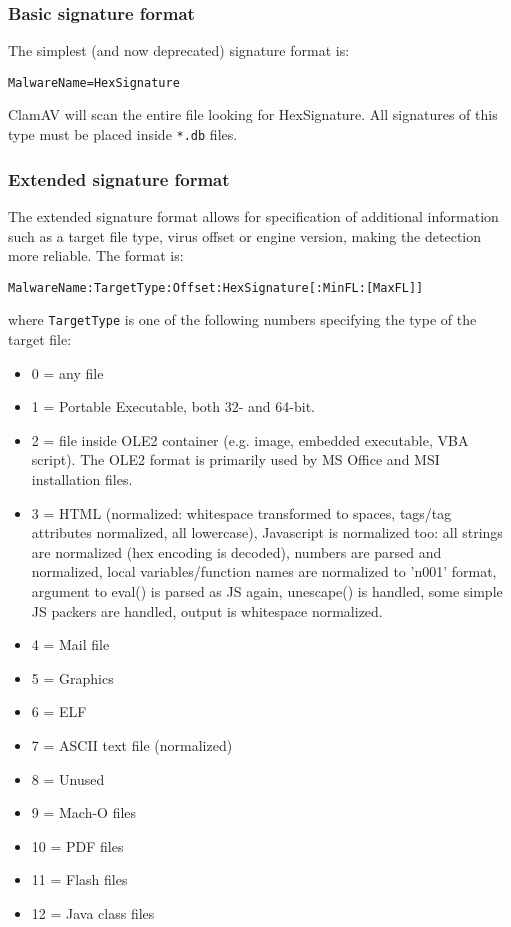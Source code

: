 \documentclass[a4paper,titlepage,12pt]{article}
\begin{document}
    \subsubsection{Basic signature format}
    The simplest (and now deprecated) signature format is:
    \begin{verbatim}
MalwareName=HexSignature
    \end{verbatim}
    ClamAV will scan the entire file looking for HexSignature. All
    signatures of this type must be placed inside \verb+*.db+ files.

    \subsubsection{Extended signature format}\label{ndb}
    The extended signature format allows for specification of additional
    information such as a target file type, virus offset or engine version,
    making the detection more reliable. The format is:
    \begin{verbatim}
MalwareName:TargetType:Offset:HexSignature[:MinFL:[MaxFL]]
    \end{verbatim}
    where \verb+TargetType+ is one of the following numbers specifying
    the type of the target file:
    \begin{itemize}
	\item 0 = any file
	\item 1 = Portable Executable, both 32- and 64-bit.
	\item 2 = file inside OLE2 container (e.g. image, embedded executable,
	VBA script). The OLE2 format is primarily used by MS Office and MSI
	installation files.
	\item 3 = HTML (normalized: whitespace transformed to spaces, tags/tag
	attributes normalized, all lowercase), Javascript is normalized too:
	all strings are normalized (hex encoding is decoded), numbers are
	parsed and normalized, local variables/function names are normalized
	to 'n001' format, argument to eval() is parsed as JS again,
	unescape() is handled, some simple JS packers are handled,
	output is whitespace normalized.
	\item 4 = Mail file
	\item 5 = Graphics
	\item 6 = ELF
	\item 7 = ASCII text file (normalized)
	\item 8 = Unused
	\item 9 = Mach-O files
	\item 10 = PDF files
	\item 11 = Flash files
	\item 12 = Java class files
    \end{itemize}
\end{document}
